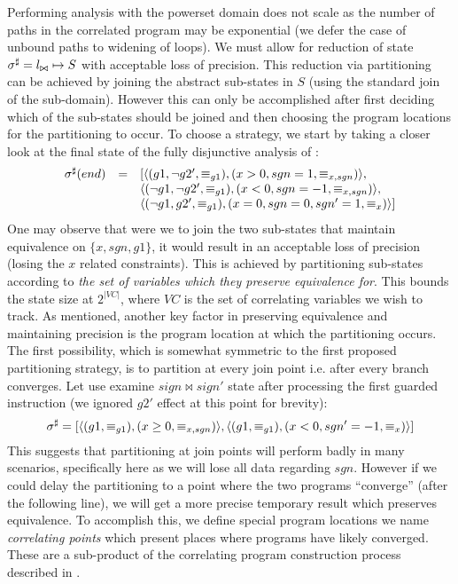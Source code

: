 Performing analysis with the powerset domain does not scale as the number of paths in the correlated program may be exponential (we defer the case of unbound paths to widening of loops). We must allow for reduction of state $\sigma^\sharp = l_{\bowtie} \mapsto S$ with acceptable loss of precision. This reduction via partitioning can be achieved by joining the abstract sub-states in $S$ (using the standard join of the sub-domain). However this can only be accomplished after first deciding which of the sub-states should be joined and then choosing the program locations for the partitioning to occur. To choose a strategy, we start by taking a closer look at the final state of the fully disjunctive analysis of :
{\footnotesize
\[
\begin{array}{lll}
\sigma^\sharp(end) & = & [ 
\langle (g1,\neg g2',\equiv_{g1}),(x>0,sgn=1,\equiv_{x,sgn}) \rangle, \\
& & \langle (\neg g1,\neg g2',\equiv_{g1}), (x<0,sgn=-1,\equiv_{x,sgn}) \rangle, \\
& & \langle (\neg g1,g2',\equiv_{g1}),(x=0,sgn=0,sgn'=1,\equiv_{x}) \rangle ]
\end{array}
\]
}
One may observe that were we to join the two sub-states that maintain equivalence on $\{x,sgn,g1\}$, it would result in an acceptable loss of precision (losing the $x$ related constraints). This is achieved by partitioning sub-states according to \emph{the set of variables which they preserve equivalence for}. This bounds the state size at $2^{|VC|}$, where $VC$ is the set of correlating variables we wish to track.
As mentioned, another key factor in preserving equivalence and maintaining precision is the program location at which the partitioning occurs. The first possibility, which is somewhat symmetric to the first proposed partitioning strategy, is to partition at every join point i.e. after every branch converges. Let use examine $sign \bowtie sign'$ state after processing the first guarded instruction  (we ignored $g2'$ effect at this point for brevity):
{\footnotesize
\[
\sigma^\sharp = [ \langle (g1,\equiv_{g1}),(x \geq 0,\equiv_{x,sgn}) \rangle,
\langle (g1,\equiv_{g1}),(x < 0,sgn' = -1, \equiv_{x}) \rangle ]
\]
}
This suggests that partitioning at join points will perform badly in many scenarios, specifically here as we will lose all data regarding $sgn$. However if we could delay the partitioning to a point where the two programs ``converge'' (after the following  line), we will get a more precise temporary result which preserves equivalence. To accomplish this, we define special program locations we name \emph{correlating points} which present places where programs have likely converged. These are a sub-product of the correlating program construction process described in .


